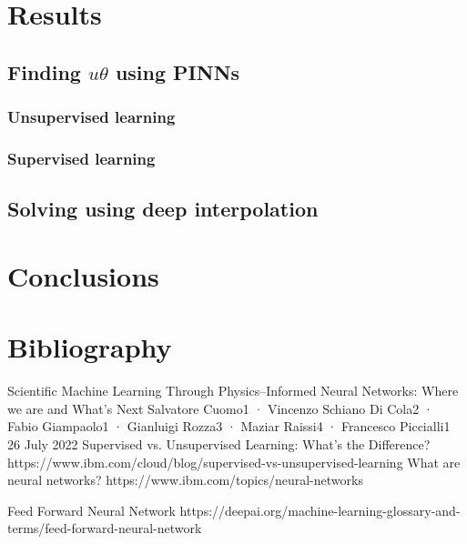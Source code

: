\documentclass{article}
\begin{document}
\section{Results}
\subsection{Finding $u\theta$ using PINNs}


\subsubsection{Unsupervised learning}


\subsubsection{Supervised learning}


\subsection{Solving using deep interpolation}



\section{Conclusions}

\newpage

\section{Bibliography}
 {Scientific Machine Learning Through Physics–Informed Neural Networks: Where we are and What’s Next}
Salvatore Cuomo1 · Vincenzo Schiano Di Cola2 · Fabio Giampaolo1 · Gianluigi Rozza3 · Maziar Raissi4 · Francesco Piccialli1
26 July 2022
 {Supervised vs. Unsupervised Learning: What’s the Difference?} {https://www.ibm.com/cloud/blog/supervised-vs-unsupervised-learning}
 {What are neural networks?} {https://www.ibm.com/topics/neural-networks}

 {Feed Forward Neural Network} {https://deepai.org/machine-learning-glossary-and-terms/feed-forward-neural-network}
\end{document}
